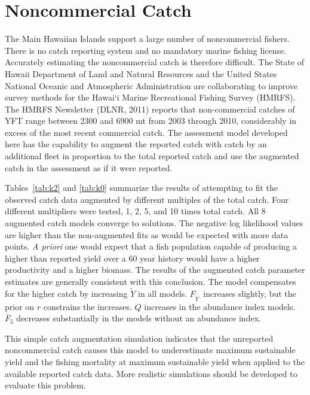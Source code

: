 \documentclass[12pt,letterpaper]{article}
\newcommand\MSY{\widetilde{Y}}
\newcommand\Fmsy{F_{\MSY}}
\begin{document}
\clearpage
\section{Noncommercial Catch}
\label{sec:klingon}
The Main Hawaiian Islands support a large number of noncommercial
fishers. There is no catch reporting system and no mandatory marine fishing
license. 
Accurately estimating the noncommercial catch is therefore difficult. 
The State of Hawaii Department of Land and Natural Resources and the
United States National Oceanic and Atmospheric Administration are  
collaborating to improve survey methods for the Hawai`i Marine
Recreational Fishing Survey (HMRFS). The HMRFS Newsletter (DLNR, 2011)
reports that non-commercial catches of YFT range between 2300 and 6900
mt from 2003 through 2010, considerably in excess of the most recent
commercial catch. The assessment model developed here has the capability to
augment the reported catch with catch by an additional fleet in
proportion to the total reported catch and use the augmented catch in
the assessment as if it were reported.

Tables~\ref{tab:k2} and \ref{tab:k0} summarize the results of
attempting to fit the observed catch data augmented by 
different multiples of the total catch. Four different multipliers
were tested, 1, 2, 5, and 10 times total catch.
All 8 augmented catch models converge to solutions. The negative
log likelihood values are higher than the non-augmented fits as would
be expected with more data points.
{\it A priori} one would expect that a fish population capable
of producing a higher than reported yield over a 60 year history
would have a higher productivity and a higher biomass. The results of
the augmented catch parameter estimates are generally consistent with
this conclusion. 
The model compensates for the higher catch by
increasing $\MSY$ in all models. $\Fmsy$\ increases slightly, but the
prior on $r$ constrains the increases. $Q$ increases in
the abundance index models. $\bar{F}_5$ decreases substantially in the
models without an abundance index.

This simple catch augmentation simulation indicates that the unreported
noncommercial catch causes this model to underestimate maximum
sustainable yield and the fishing mortality at maximum sustainable
yield when applied to the available reported catch data.
More realistic simulations should be developed to evaluate this
problem.
\end{document}
